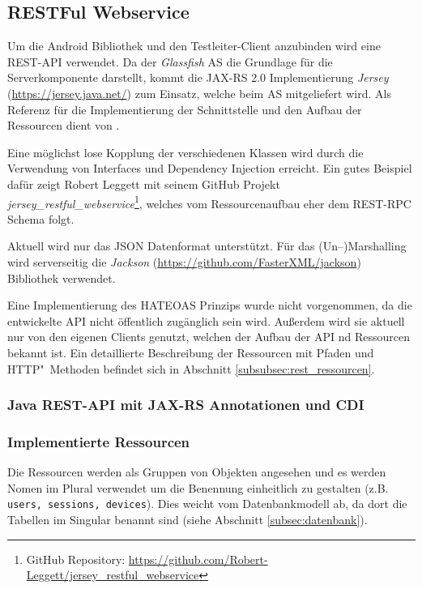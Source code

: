 \subsection{RESTFul Webservice}
Um die Android Bibliothek und den Testleiter-Client anzubinden wird eine \ac{REST}-\ac{API} verwendet.
Da der \emph{Glassfish} \ac{AS} die Grundlage für die Serverkomponente darstellt, kommt die \ac{JAX-RS} 2.0 Implementierung \emph{Jersey} (\url{https://jersey.java.net/}) zum Einsatz, welche beim \ac{AS} mitgeliefert wird.
Als Referenz für die Implementierung der Schnittstelle und den Aufbau der Ressourcen dient  von \citeauthor{Burke.2014} \cite{Burke.2014}.

Eine möglichst lose Kopplung der verschiedenen Klassen wird durch die Verwendung von Interfaces und Dependency Injection erreicht.
Ein gutes Beispiel dafür zeigt Robert Leggett mit seinem GitHub Projekt \emph{jersey\_restful\_webservice}\footnote{GitHub Repository: \url{https://github.com/Robert-Leggett/jersey_restful_webservice}}, welches vom Ressourcenaufbau eher dem \ac{REST}-\ac{RPC} Schema folgt.

Aktuell wird nur das \ac{JSON} Datenformat unterstützt.
Für das (Un--)Marshalling wird serverseitig die \emph{Jackson} (\url{https://github.com/FasterXML/jackson}) Bibliothek verwendet.

Eine Implementierung des \ac{HATEOAS} Prinzips \cite[vgl.][11-13]{Burke.2014} wurde nicht vorgenommen, da die entwickelte \ac{API} nicht öffentlich zugänglich sein wird.
Außerdem wird sie aktuell nur von den eigenen Clients genutzt, welchen der Aufbau der \ac{API} nd Ressourcen bekannt ist.
Ein detaillierte Beschreibung der Ressourcen mit Pfaden und \ac{HTTP}"~Methoden befindet sich in Abschnitt \ref{subsubsec:rest_ressourcen}.

\subsubsection{Java REST-API mit JAX-RS Annotationen und CDI}

\subsubsection{Implementierte Ressourcen\label{subsubsec:rest_ressourcen}}
Die Ressourcen werden als Gruppen von Objekten angesehen und es werden Nomen im Plural verwendet \cite[vgl.][20\psqq]{Burke.2014} um die Benennung einheitlich zu gestalten (z.B. \texttt{users, sessions, devices}).
Dies weicht vom Datenbankmodell ab, da dort die Tabellen im Singular benannt sind (siehe Abschnitt \ref{subsec:datenbank}).

